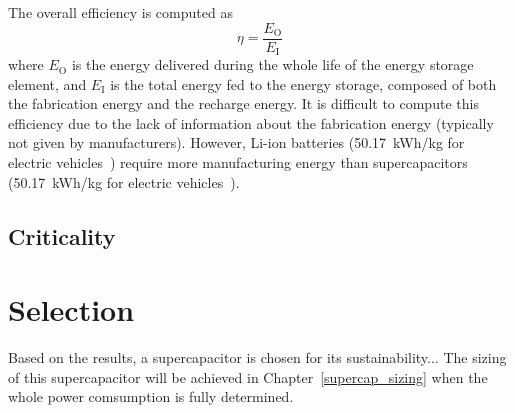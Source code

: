 \documentclass{EPL-master-thesis-covers-EN}
\newcommand{\te}[1]{\textrm{#1}}
\begin{document}
The overall efficiency is computed as
\[
 \eta = \frac{E_\te{O}}{E_\te{I}}
\]
where $E_\te{O}$ is the energy delivered during the whole life of the energy storage element, and $E_\te{I}$ is the total energy fed to the energy storage, composed of both the fabrication energy and the recharge energy. It is difficult to compute this efficiency due to the lack of information about the fabrication energy (typically not given by manufacturers). However, Li-ion batteries (\SI{50.17}{kWh/kg} for electric vehicles~\cite{manufacturing_lithium}) require more manufacturing energy than supercapacitors (\SI{50.17}{kWh/kg} for electric vehicles~\cite{manufacturing_lithium}).


\subsection*{Criticality}

    
\section{Selection}

Based on the results, a supercapacitor is chosen for its sustainability... The sizing of this supercapacitor will be achieved in Chapter~\ref{supercap_sizing} when the whole power comsumption is fully determined. 
\end{document}
